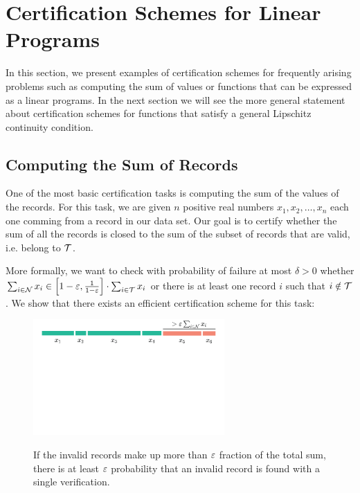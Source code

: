 \section{Certification Schemes for Linear Programs} \label{sec:certification}

  In this section, we present examples of certification schemes for frequently arising problems such as computing the sum 
of values or functions that can be expressed as a linear programs. In the next section we will see the more general statement
about certification schemes for functions that satisfy a general Lipschitz continuity condition.

\subsection{Computing the Sum of Records} \label{ssec:certificationSum}

  One of the most basic certification tasks is computing the sum of the values of the records. For this task, we are given $n$ 
positive real numbers $x_1, x_2, \dots, x_n$ each one comming from a record in our data set. Our goal is to certify whether the
sum of all the records is closed to the sum of the subset of records that are valid, i.e. belong to $\mathcal{T}$. 

  More formally, we want to check with probability of failure at most $\delta > 0$ whether 
$\sum_{i \in \mathcal{N}} x_i \in \left[1 - \varepsilon, \frac{1}{1 - \varepsilon} \right] \cdot \sum_{i \in \mathcal{T}} x_i$ or there is at least 
one record $i$ such that $i \notin {\cal T}$. We show that there exists an efficient certification scheme for this task:

\begin{figure}[!h] \label{fig:certification sum}
  \centering
  {\includegraphics[clip, trim=1cm 17cm 2cm 0.2cm,width=0.65\textwidth]{figure4.pdf}}
  \caption{If the invalid records make up more than $\varepsilon$ fraction of the total sum, there is at least $\varepsilon$ probability that an invalid record is found with a single verification.}
\end{figure}


